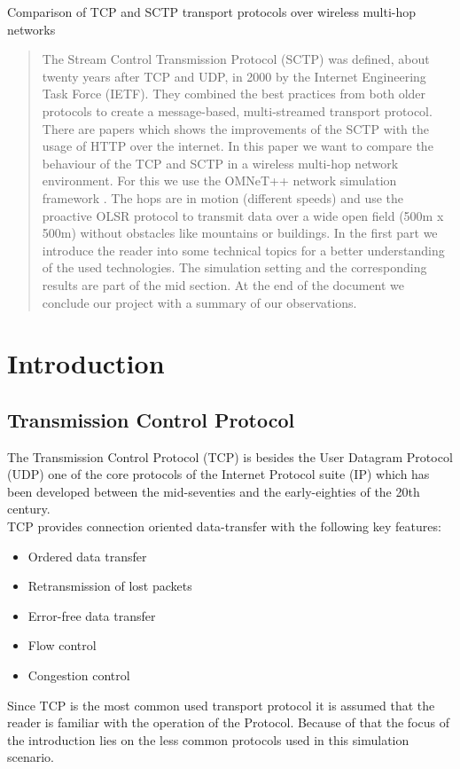 \documentclass[a4paper]{article}
\begin{document}
 
 

\begin{center}
	\huge{Comparison of TCP and SCTP transport protocols over wireless multi-hop networks}
\end{center}

\begin{abstract}
The Stream Control Transmission Protocol (SCTP) was defined, about twenty years after TCP and UDP, in 2000 by the Internet Engineering Task Force (IETF). They combined the best practices from both older protocols to create a message-based, multi-streamed transport protocol. There are papers \cite{sctp_vs_tcp}\cite{sctp_vs_tcp2} which shows the improvements of the SCTP with the usage of HTTP over the internet. In this paper we want to compare the behaviour of the TCP and SCTP in a wireless multi-hop network environment. For this we use the OMNeT++ network simulation framework \cite{omnetpp}. The hops are in motion (different speeds) and use the proactive OLSR protocol to transmit data over a wide open field (500m x 500m) without obstacles like mountains or buildings. In the first part we introduce the reader into some technical topics for a better understanding of the used technologies. The simulation setting and the corresponding results are part of the mid section. At the end of the document we conclude our project with a summary of our observations.
\end{abstract}

\tableofcontents

\section{Introduction}

\subsection{Transmission Control Protocol}

The Transmission Control Protocol (TCP) is besides the User Datagram Protocol (UDP) one of the core protocols of the Internet Protocol suite (IP) which has been developed between the mid-seventies and the early-eighties of the 20th century.\\
TCP provides connection oriented data-transfer with the following key features:
\begin{itemize}
	\item Ordered data transfer
	\item Retransmission of lost packets
	\item Error-free data transfer 
	\item Flow control 
	\item Congestion control
\end{itemize}
Since TCP is the most common used transport protocol it is assumed that the reader is familiar with the operation of the Protocol. Because of that the focus of the introduction lies on the less common protocols used in this simulation scenario.
\end{document}
